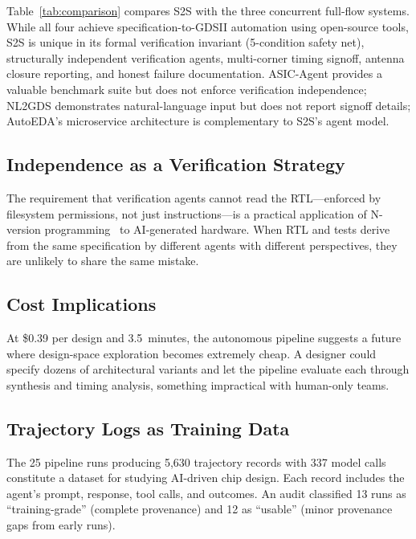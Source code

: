 \documentclass[journal]{IEEEtran}
\begin{document}
Table~\ref{tab:comparison} compares S2S with the three concurrent full-flow systems. While all four achieve specification-to-GDSII automation using open-source tools, S2S is unique in its formal verification invariant (5-condition safety net), structurally independent verification agents, multi-corner timing signoff, antenna closure reporting, and honest failure documentation. ASIC-Agent provides a valuable benchmark suite but does not enforce verification independence; NL2GDS demonstrates natural-language input but does not report signoff details; AutoEDA's microservice architecture is complementary to S2S's agent model.

\subsection{Independence as a Verification Strategy}

The requirement that verification agents cannot read the RTL---enforced by filesystem permissions, not just instructions---is a practical application of N-version programming~\cite{avizienis1985nversion} to AI-generated hardware. When RTL and tests derive from the same specification by different agents with different perspectives, they are unlikely to share the same mistake.

\subsection{Cost Implications}

At \$0.39 per design and 3.5~minutes, the autonomous pipeline suggests a future where design-space exploration becomes extremely cheap. A designer could specify dozens of architectural variants and let the pipeline evaluate each through synthesis and timing analysis, something impractical with human-only teams.

\subsection{Trajectory Logs as Training Data}

The 25 pipeline runs producing 5,630 trajectory records with 337 model calls constitute a dataset for studying AI-driven chip design. Each record includes the agent's prompt, response, tool calls, and outcomes. An audit classified 13 runs as ``training-grade'' (complete provenance) and 12 as ``usable'' (minor provenance gaps from early runs).

\end{document}
